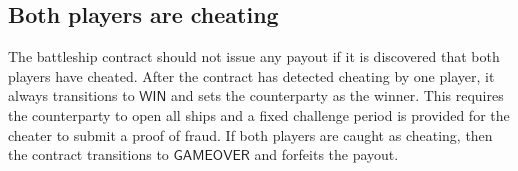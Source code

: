 \documentclass{llncs}
\newcommand{\gamewinner}{\mathsf{WIN}}
\newcommand{\gamefinished}{\mathsf{GAMEOVER}}
\newcommand{\hcell}{\mathsf{hcell}}
\begin{document}
	\subsection{Both players are cheating} 
	
	The battleship contract should not issue any payout if it is discovered that both players have cheated. 
	After the contract has detected cheating by one player, it always transitions to $\gamewinner$ and sets the counterparty as the winner.
	This requires the counterparty to open all ships and a fixed challenge period is provided for the cheater to submit a proof of fraud.
	If both players are caught as cheating, then the contract transitions to $\gamefinished$ and forfeits the payout. 
	
\end{document}
